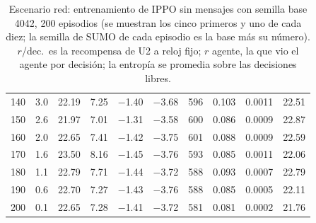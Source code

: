 \begin{table}[H]
\begin{tabular}{rrrrrrrrrr}
140 & 3.0 & 22.19 & 7.25 & $-$1.40 & $-$3.68 & 596 & 0.103 & 0.0011 & 22.51 \\
150 & 2.6 & 21.97 & 7.01 & $-$1.31 & $-$3.58 & 600 & 0.086 & 0.0009 & 22.87 \\
160 & 2.0 & 22.65 & 7.41 & $-$1.42 & $-$3.75 & 601 & 0.088 & 0.0009 & 22.59 \\
170 & 1.6 & 23.50 & 8.16 & $-$1.45 & $-$3.76 & 593 & 0.085 & 0.0011 & 22.06 \\
180 & 1.1 & 22.79 & 7.71 & $-$1.44 & $-$3.72 & 588 & 0.093 & 0.0007 & 22.79 \\
190 & 0.6 & 22.70 & 7.27 & $-$1.43 & $-$3.76 & 588 & 0.085 & 0.0005 & 22.11 \\
200 & 0.1 & 22.65 & 7.28 & $-$1.41 & $-$3.72 & 581 & 0.081 & 0.0002 & 21.76 \\
\bottomrule
\end{tabular}
\caption[Escenario red: entrenamiento de IPPO sin mensajes, semilla base 4042]{Escenario red: entrenamiento de IPPO sin mensajes con semilla base 4042, 200 episodios (se muestran los cinco primeros y uno de cada diez; la semilla de SUMO de cada episodio es la base más su número). $r$/dec.\ es la recompensa de U2 a reloj fijo; $r$ agente, la que vio el agente por decisión; la entropía se promedia sobre las decisiones libres.}
\label{tab:red-ippo-local-4042}
\end{table}

